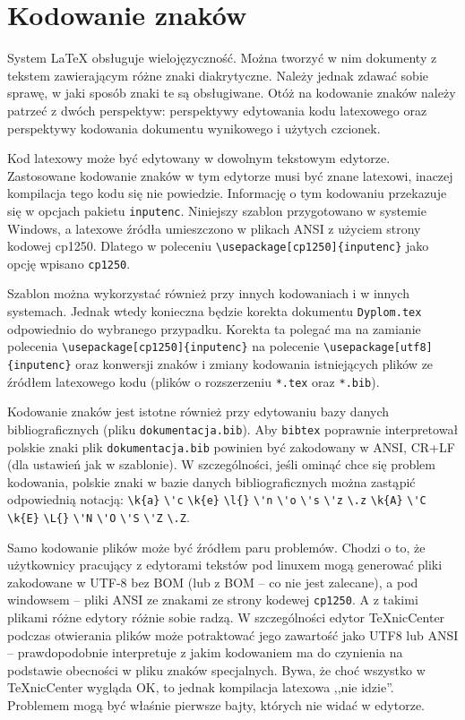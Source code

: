 \section{Kodowanie znaków}
System LaTeX obsługuje wielojęzyczność. Można tworzyć w nim dokumenty z tekstem zawierającym różne znaki diakrytyczne. 
Należy jednak zdawać sobie sprawę, w jaki sposób znaki te są obsługiwane. Otóż na kodowanie znaków należy patrzeć z dwóch perspektyw: perspektywy edytowania kodu latexowego oraz perspektywy kodowania dokumentu wynikowego i użytych czcionek.

Kod latexowy może być edytowany w dowolnym tekstowym edytorze. Zastosowane kodowanie znaków w tym edytorze musi być znane latexowi, inaczej kompilacja tego kodu się nie powiedzie. Informację o tym kodowaniu przekazuje się w opcjach pakietu \texttt{inputenc}. Niniejszy szablon przygotowano w systemie Windows, a latexowe źródła umieszczono w plikach ANSI z użyciem strony kodowej cp1250. Dlatego w poleceniu \verb+\usepackage[cp1250]{inputenc}+ jako opcję wpisano \texttt{cp1250}.


Szablon można wykorzystać również przy innych kodowaniach i w innych systemach. Jednak wtedy konieczna będzie korekta dokumentu \texttt{Dyplom.tex} odpowiednio do wybranego przypadku. Korekta ta polegać ma na zamianie polecenia \verb+\usepackage[cp1250]{inputenc}+  na polecenie \verb+\usepackage[utf8]{inputenc}+ oraz konwersji znaków i zmiany kodowania istniejących plików ze źródłem latexowego kodu (plików o rozszerzeniu \texttt{*.tex} oraz \texttt{*.bib}).

Kodowanie znaków jest istotne również przy edytowaniu bazy danych bibliograficznych (pliku \texttt{dokumentacja.bib}). Aby \texttt{bibtex} poprawnie interpretował polskie znaki plik \texttt{dokumentacja.bib} powinien być zakodowany w ANSI, CR+LF (dla ustawień jak w szablonie). 
W szczególności, jeśli ominąć chce się problem kodowania, polskie znaki w bazie danych bibliograficznych można zastąpić odpowiednią notacją: \verb|\k{a}| \verb|\'c| \verb|\k{e}| \verb|\l{}| \verb|\'n| \verb|\'o| \verb|\'s| \verb|\'z| \verb|\.z| \verb|\k{A}| \verb|\'C| \verb|\k{E}| \verb|\L{}| \verb|\'N| \verb|\'O| \verb|\'S| \verb|\'Z| \verb|\.Z|. 

Samo kodowanie plików może być źródłem paru problemów. Chodzi o to, że użytkownicy pracujący z edytorami tekstów pod linuxem mogą generować pliki zakodowane w UTF-8 bez BOM (lub z BOM -- co nie jest zalecane), a pod windowsem -- pliki ANSI ze znakami ze strony kodewej \texttt{cp1250}. A z takimi plikami różne edytory różnie sobie radzą. W szczególności edytor TeXnicCenter podczas otwierania plików może potraktować jego zawartość jako UTF8 lub ANSI -- prawdopodobnie interpretuje z jakim kodowaniem ma do czynienia na podstawie obecności w pliku znaków specjalnych. Bywa, że choć wszystko w TeXnicCenter wygląda OK, to jednak kompilacja latexowa ,,nie idzie''. Problemem mogą być właśnie pierwsze bajty, których nie widać w edytorze. 

